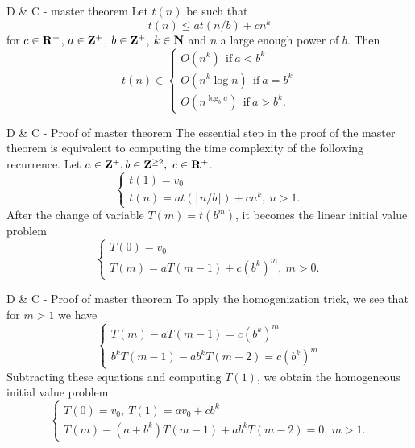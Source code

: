 \documentclass{beamer}
\begin{document}
%

\begin{frame}{D \& C - master theorem}
	Let $t(n)$ be such that
	\[
		t(n) \leq at(n/b) + cn^k
	\]
	for $c \in \mathbf{R}^+$, $a \in \mathbf{Z}^+$, $b \in \mathbf{Z}^+$, $k \in \mathbf{N}$ and $n$ a
	large enough power of $b$. Then
	\[
		t(n) \in
		\begin{cases}
			O(n^k)\ \ \text{if}\ a < b^k\\
			O(n^k\log n)\ \ \text{if}\ a = b^k\\
			O(n^{\log_b a})\ \ \text{if}\ a > b^k.
		\end{cases}
	\]
\end{frame}

%

\begin{frame}{D \& C - Proof of master theorem}
	The essential step in the proof of the master theorem is equivalent to
	computing the time complexity of the following recurrence. Let $a \in \mathbf{Z}^+,
	b \in \mathbf{Z}^{\geq 2},\ c \in \mathbf{R}^+$.
	\[
		\begin{cases}\label{mtr} %
			t(1)= v_0\\
			t(n)= at(\lceil n/b \rceil) + cn^k,\ n > 1.
		\end{cases}
	\]
	After the change of variable $T(m)= t(b^m)$, it becomes the linear initial
	value problem
	\[
		\begin{cases}\label{mtl} %
			T(0)= v_0\\
			T(m)= aT(m-1) + c(b^k)^m,\ m > 0.
		\end{cases}
	\]
\end{frame}

%

\begin{frame}{D \& C - Proof of master theorem}
	To apply the homogenization trick, we see that for $m > 1$ we have 
	\[
		\begin{cases}
			T(m) - aT(m-1) = c(b^k)^m\\
			b^kT(m-1) - ab^kT(m-2) = c(b^k)^m
		\end{cases}
	\]
	Subtracting these equations and computing $T(1)$, we obtain the homogeneous
	initial value problem
	\[
		\begin{cases}
			T(0)= v_0,\ T(1)= av_0 + cb^k\\
			T(m) - (a + b^k)T(m-1) + ab^kT(m-2)= 0,\ m > 1.
		\end{cases}
	\]
\end{frame}

%
\end{document}
